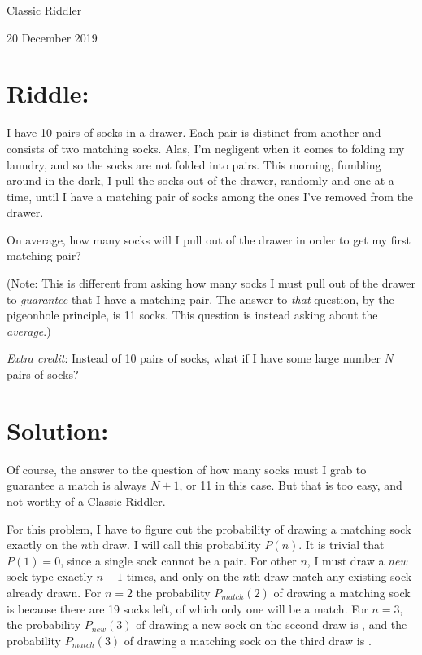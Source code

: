 \documentclass{article}
\begin{document}
\pagestyle{empty} %


\begin{center}
{\LARGE Classic Riddler}

\vspace{0.15in}

{\Large 20 December 2019}
\end{center}


\section*{Riddle:}

I have 10 pairs of socks in a drawer.
Each pair is distinct from another and consists of two matching socks.
Alas, I’m negligent when it comes to folding my laundry, and so the socks are not folded into pairs.
This morning, fumbling around in the dark, I pull the socks out of the drawer, randomly and one at a time, until I have a matching pair of socks among the ones I’ve removed from the drawer.

On average, how many socks will I pull out of the drawer in order to get my first matching pair?

(Note: This is different from asking how many socks I must pull out of the drawer to \textit{guarantee} that I have a matching pair.
The answer to \textit{that} question, by the pigeonhole principle, is 11 socks.
This question is instead asking about the \textit{average}.)

\textit{Extra credit}: Instead of 10 pairs of socks, what if I have some large number $N$ pairs of socks?


\section*{Solution:}

Of course, the answer to the question of how many socks must I grab to guarantee a match is always $N+1$, or 11 in this case.
But that is too easy, and not worthy of a Classic Riddler.

For this problem, I have to figure out the probability of drawing a matching sock exactly on the $n\mathrm{th}$ draw.
I will call this probability $P(n)$.
It is trivial that $P(1)=0$, since a single sock cannot be a pair.
For other $n$, I must draw a \textit{new} sock type exactly $n-1$ times, and only on the $n\mathrm{th}$ draw  match any existing sock already drawn.
For $n=2$ the probability $P_{match}(2)$ of drawing a matching sock is  because there are 19 socks left, of which only one will be a match.
For $n=3$, the probability $P_{new}(3)$ of drawing a new sock on the second draw is , and the probability $P_{match}(3)$ of drawing a matching sock on the third draw is .
\end{document}
